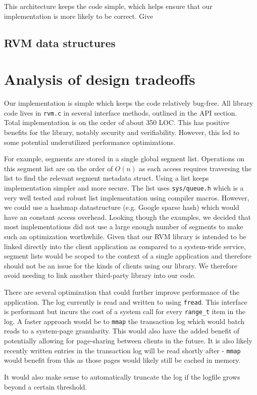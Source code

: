 \documentclass{report} %
\numberwithin{equation}{section} %
\numberwithin{figure}{section} %
\numberwithin{table}{section} %
\begin{document}
This architecture keeps the code simple, which helps ensure that our implementation is more likely to be correct. Give


\subsection{RVM data structures}



\section{Analysis of design tradeoffs}

Our implementation is simple which keeps the code relatively bug-free. All library code lives in \texttt{rvm.c} in several interface methods, outlined in the API section. Total implementation is on the order of about 350 LOC. This has positive benefits for the library, notably security and verifiability. However, this led to some potential underutilized performance optimizations.

For example, segments are stored in a single global segment list. Operations on this segment list are on the order of $O(n)$ as each access requires traversing the list to find the relevant segment metadata struct. Using a list keeps implementation simpler and more secure. The list uses \texttt{sys/queue.h} which is a very well tested and robust list implementation using compiler macros. However, we could use a hashmap datastructure (e.g. Google sparse hash) which would have an constant access overhead. Looking though the examples, we decided that most implementations did not use a large enough number of segments to make such an optimization worthwhile. Given that our RVM library is intended to be linked directly into the client application as compared to a system-wide service, segment lists would be scoped to the context of a single application and therefore should not be an issue for the kinds of clients using our library. We therefore avoid needing to link another third-party library into our code.

There are several optimization that could further improve performance of the application. The log currently is read and written to using \texttt{fread}. This interface is performant but incurs the cost of a system call for every \texttt{range\_t} item in the log. A faster approach would be to \texttt{mmap} the transaction log which would batch reads to a system-page granularity. This would also have the added benefit of potentially allowing for page-sharing between clients in the future. It is also likely recently written entries in the transaction log will be read shortly after - \texttt{mmap} would benefit from this as those pages would likely still be cached in memory.

It would also make sense to automatically truncate the log if the logfile grows beyond a certain threshold.
\end{document}
